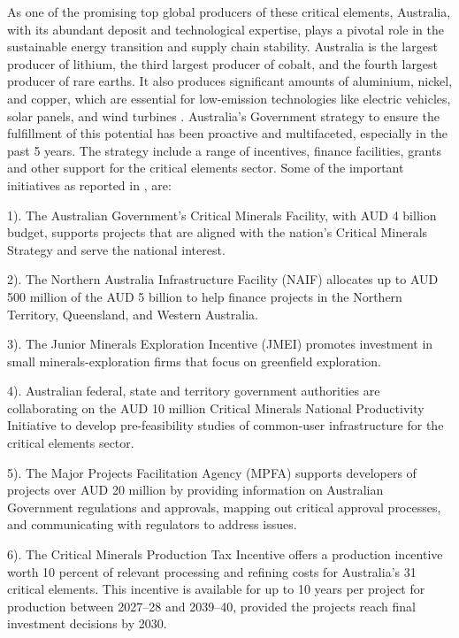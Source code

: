 \documentclass[11pt,a4paper,]{article}
\begin{document}
As one of the promising top global producers of these critical elements, Australia, with its abundant deposit and technological expertise, plays a pivotal role in the sustainable energy transition and supply chain stability. Australia is the largest producer of lithium, the third largest producer of cobalt, and the fourth largest producer of rare earths. It also produces significant amounts of aluminium, nickel, and copper, which are essential for low-emission technologies like electric vehicles, solar panels, and wind turbines \autocite{DISR2023}. Australia's Government strategy to ensure the fulfillment of this potential has been proactive and multifaceted, especially in the past 5 years. The strategy include a range of incentives, finance facilities, grants and other support for the critical elements sector. Some of the important initiatives as reported in \textcite{DISR2023}, are:

1). The Australian Government's Critical Minerals Facility, with AUD 4 billion budget, supports projects that are aligned with the nation's Critical Minerals Strategy and serve the national interest.

2). The Northern Australia Infrastructure Facility (NAIF) allocates up to AUD 500 million of the AUD 5 billion to help finance projects in the Northern Territory, Queensland, and Western Australia.

3). The Junior Minerals Exploration Incentive (JMEI) promotes investment in small minerals-exploration firms that focus on greenfield exploration.

4). Australian federal, state and territory government authorities are collaborating on the AUD 10 million Critical Minerals National Productivity Initiative to develop pre-feasibility studies of common-user infrastructure for the critical elements sector.

5). The Major Projects Facilitation Agency (MPFA) supports developers of projects over AUD 20 million by providing information on Australian Government regulations and approvals, mapping out critical approval processes, and communicating with regulators to address issues.

6). The Critical Minerals Production Tax Incentive offers a production incentive worth 10 percent of relevant processing and refining costs for Australia's 31 critical elements. This incentive is available for up to 10 years per project for production between 2027--28 and 2039--40, provided the projects reach final investment decisions by 2030.
\end{document}
